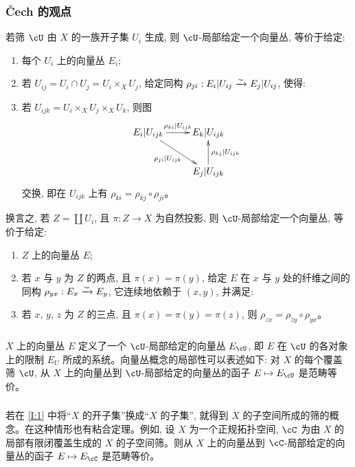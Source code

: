 \subsubsection{Čech 的观点}\label{I:1-3-2}

若筛 $\cU$ 由 $X$ 的一族开子集 $U_i$ 生成, 则 $\cU$-局部给定一个向量丛, 等价于给定:
\begin{enumerate}[\indent a)]
  \item 每个 $U_i$ 上的向量丛 $E_i$;
  \item 若 $U_{ij}=U_i\cap U_j=U_i\times_X U_j$, 给定同构
    $\rho_{ji}:E_i|U_{ij}\xrightarrow\sim E_j|U_{ij}$, 使得:
  \item 若 $U_{ijk}=U_i\times_X U_j\times_X U_k$, 则图
    \[\xymatrix{
      E_i |U_{ijk} \ar[r]^-{\rho_{ki}|U_{ijk}} \ar[dr]_-{\rho_{ji}|U_{ijk}}
        & E_k|U_{ijk} \\
      & E_j|U_{ijk} \ar[u]_-{\rho_{kj}|U_{ijk}}
    }\]
    交换, 即在 $U_{ijk}$ 上有 $\rho_{ki}=\rho_{kj}\circ\rho_{ji}$。
\end{enumerate}

换言之, 若 $Z=\coprod U_i$, 且 $\pi:Z\to X$ 为自然投影, 则 $\cU$-局部给定一个向量丛, 等价于给定:
\begin{enumerate}[\indent a)]
  \item $Z$ 上的向量丛 $E$;
  \item 若 $x$ 与 $y$ 为 $Z$ 的两点, 且 $\pi(x)=\pi(y)$, 给定 $E$ 在 $x$ 与 $y$ 处的纤维之间的同构 $\rho_{yx}:E_x\xrightarrow\sim E_y$, 它连续地依赖于 $(x,y)$, 并满足:
  \item 若 $x$, $y$, $z$ 为 $Z$ 的三点, 且 $\pi(x)=\pi(y)=\pi(z)$, 则
    $\rho_{zx}=\rho_{zy}\circ\rho_{yx}$。
\end{enumerate}

\subsubsection{}\label{I:1-3-3}

$X$ 上的向量丛 $E$ 定义了一个 $\cU$-局部给定的向量丛 $E_\cU$, 即 $E$ 在 $\cU$ 的各对象上的限制 $E_U$ 所成的系统。向量丛概念的局部性可以表述如下: 对 $X$ 的每个覆盖筛 $\cU$, 从 $X$ 上的向量丛到 $\cU$-局部给定的向量丛的函子 $E\mapsto E_\cU$ 是范畴等价。

\subsubsection{}\label{I:1-3-4}

若在 \ref{I:1} 中将“$X$ 的开子集”换成“$X$ 的子集”, 就得到 $X$ 的子空间所成的筛的概念。在这种情形也有粘合定理。例如, 设 $X$ 为一个正规拓扑空间, $\cC$ 为由 $X$ 的局部有限闭覆盖生成的 $X$ 的子空间筛。则从 $X$ 上的向量丛到 $\cC$-局部给定的向量丛的函子 $E\mapsto E_\cC$ 是范畴等价。

